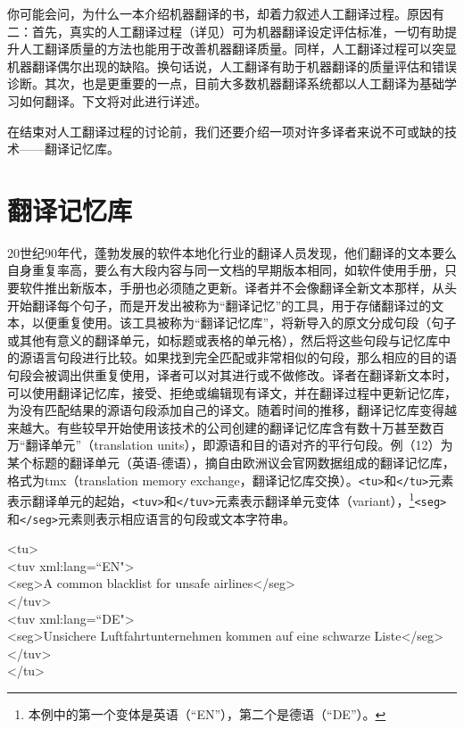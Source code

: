 \documentclass[output=paper]{langscibook}
\begin{document}
你可能会问，为什么一本介绍机器翻译的书，却着力叙述人工翻译过程。原因有二：首先，真实的人工翻译过程（详见）可为机器翻译设定评估标准，一切有助提升人工翻译质量的方法也能用于改善机器翻译质量。同样，人工翻译过程可以突显机器翻译偶尔出现的缺陷。换句话说，人工翻译有助于机器翻译的质量评估和错误诊断。其次，也是更重要的一点，目前大多数机器翻译系统都以人工翻译为基础学习如何翻译。下文将对此进行详述。

在结束对人工翻译过程的讨论前，我们还要介绍一项对许多译者来说不可或缺的技术——翻译记忆库。


\section{翻译记忆库}\label{sec:kenny:4}
20世纪90年代，蓬勃发展的软件本地化行业的翻译人员发现，他们翻译的文本要么自身重复率高，要么有大段内容与同一文档的早期版本相同，如软件使用手册，只要软件推出新版本，手册也必须随之更新。译者并不会像翻译全新文本那样，从头开始翻译每个句子，而是开发出被称为“翻译记忆”的工具，用于存储翻译过的文本，以便重复使用。该工具被称为“翻译记忆库”，将新导入的原文分成句段（句子或其他有意义的翻译单元，如标题或表格的单元格），然后将这些句段与记忆库中的源语言句段进行比较。如果找到完全匹配或非常相似的句段，那么相应的目的语句段会被调出供重复使用，译者可以对其进行或不做修改。译者在翻译新文本时，可以使用翻译记忆库，接受、拒绝或编辑现有译文，并在翻译过程中更新记忆库，为没有匹配结果的源语句段添加自己的译文。随着时间的推移，翻译记忆库变得越来越大。有些较早开始使用该技术的公司创建的翻译记忆库含有数十万甚至数百万“翻译单元”（translation units），即源语和目的语对齐的平行句段。例（12）为某个标题的翻译单元（英语-德语），摘自由欧洲议会官网数据组成的翻译记忆库，格式为tmx（translation memory exchange，翻译记忆库交换）。\texttt{<tu>}和\texttt{</tu>}元素表示翻译单元的起始，\texttt{<tuv>}和\texttt{</tuv>}元素表示翻译单元变体（variant），\footnote{本例中的第一个变体是英语（“EN”），第二个是德语（“DE”）。}\texttt{<seg>}和\texttt{</seg>}元素则表示相应语言的句段或文本字符串。

\ea\ttfamily
<tu>\\
<tuv xml:lang=“EN">\\
<seg>A common blacklist for unsafe airlines</seg>\\
</tuv>\\
<tuv xml:lang=“DE">\\
<seg>Unsichere Luftfahrtunternehmen kommen auf eine schwarze Liste</seg>\\
</tuv>\\
</tu>\\
\z
\end{document}
